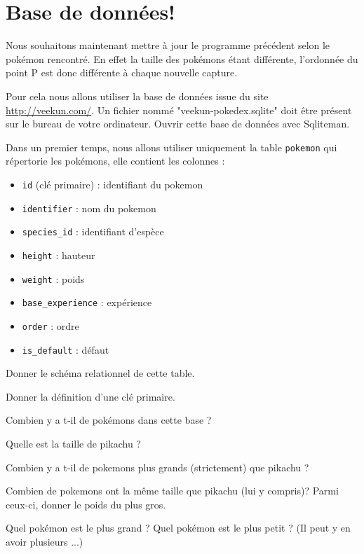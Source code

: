 
\section{Base de données!}
\label{sec:bdd}

Nous souhaitons maintenant mettre à jour le programme précédent selon le pokémon rencontré. En effet la taille des pokémons étant différente, l'ordonnée du point P est donc différente à chaque nouvelle capture.

Pour cela nous allons utiliser la base de données issue du site \url{http://veekun.com/}. Un fichier nommé "veekun-pokedex.sqlite" doit être présent sur le bureau de votre ordinateur. Ouvrir cette base de données avec Sqliteman.


Dans un premier temps, nous allons utiliser uniquement la table \texttt{pokemon} qui répertorie les pokémons, elle contient les colonnes :

\begin{itemize}[itemsep=0mm]
	\item \texttt{id} (clé primaire) : identifiant du pokemon 
	\item \texttt{identifier} : nom du pokemon
	\item \texttt{species\_id} : identifiant d'espèce
	\item \texttt{height} : hauteur
	\item \texttt{weight} : poids
	\item \texttt{base\_experience} : expérience
	\item \texttt{order} : ordre
	\item \texttt{is\_default} : défaut
\end{itemize}


\question{}
Donner le schéma relationnel de cette table.

\question{}
Donner la définition d'une clé primaire.



\question{}
Combien y a t-il de pokémons dans cette base ?


\question{}
Quelle est la taille de pikachu ?


\question{}
Combien y a t-il de pokemons plus grands (strictement) que pikachu ?


\question{}
Combien de pokemons ont la même taille que pikachu (lui y compris)? Parmi ceux-ci, donner le poids du plus gros.



\question{}
Quel pokémon est le plus grand ? Quel pokémon est le plus petit ? (Il peut y en avoir plusieurs ...)


